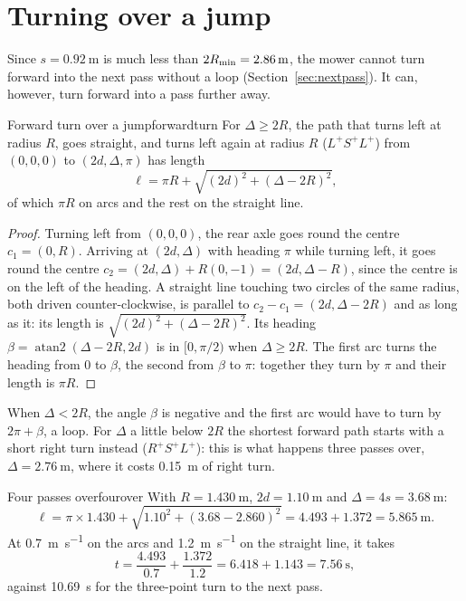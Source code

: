 \section{Turning over a jump}

Since $s = \SI{0.92}{\metre}$ is much less than $2R_{\min} =
\SI{2.86}{\metre}$, the mower cannot turn forward into the next pass without
a loop (Section~\ref{sec:nextpass}). It can, however, turn forward into a
pass further away.

\begin{proposition}{Forward turn over a jump}{forwardturn}
  For $\Delta \ge 2R$, the path that turns left at radius $R$, goes straight,
  and turns left again at radius $R$ ($L^+S^+L^+$) from $(0, 0, 0)$ to $(2d,
  \Delta, \pi)$ has length
  \[
    \ell = \pi R + \sqrt{(2d)^2 + (\Delta - 2R)^2},
  \]
  of which $\pi R$ on arcs and the rest on the straight line.
\end{proposition}

\begin{proof}
  Turning left from $(0, 0, 0)$, the rear axle goes round the centre $c_1 =
  (0, R)$. Arriving at $(2d, \Delta)$ with heading $\pi$ while turning left,
  it goes round the centre $c_2 = (2d, \Delta) + R(0, -1) = (2d, \Delta -
  R)$, since the centre is on the left of the heading. A straight line
  touching two circles of the same radius, both driven counter-clockwise,
  is parallel to $c_2 - c_1 = (2d, \Delta - 2R)$ and as long as it: its
  length is $\sqrt{(2d)^2 + (\Delta - 2R)^2}$. Its heading $\beta =
  \operatorname{atan2}(\Delta - 2R, 2d)$ is in $[0, \pi/2)$ when $\Delta
  \ge 2R$. The first arc turns the heading from $0$ to $\beta$, the second
  from $\beta$ to $\pi$: together they turn by $\pi$ and their length is
  $\pi R$.
\end{proof}

When $\Delta < 2R$, the angle $\beta$ is negative and the first arc would
have to turn by $2\pi + \beta$, a loop. For $\Delta$ a little below $2R$ the
shortest forward path starts with a short right turn instead ($R^+S^+L^+$):
this is what happens three passes over, $\Delta = \SI{2.76}{\metre}$, where
it costs \SI{0.15}{\metre} of right turn.

\begin{example}{Four passes over}{fourover}
  With $R = \SI{1.430}{\metre}$, $2d = \SI{1.10}{\metre}$ and $\Delta = 4 s
  = \SI{3.68}{\metre}$:
  \[
    \ell = \pi \times 1.430 + \sqrt{1.10^2 + (3.68 - 2.860)^2}
         = 4.493 + 1.372 = \SI{5.865}{\metre}.
  \]
  At \SI{0.7}{\metre\per\second} on the arcs and \SI{1.2}{\metre\per\second}
  on the straight line, it takes
  \[
    t = \frac{4.493}{0.7} + \frac{1.372}{1.2} = 6.418 + 1.143
      = \SI{7.56}{\second},
  \]
  against \SI{10.69}{\second} for the three-point turn to the next pass.
\end{example}

